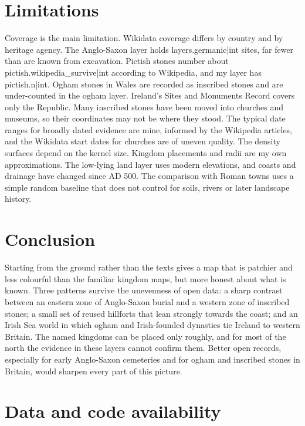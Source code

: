 \documentclass[11pt,a4paper]{article}
\begin{document}
\section{Limitations}

Coverage is the main limitation. Wikidata coverage differs by country and by heritage agency. The Anglo-Saxon layer holds {{layers.germanic|int}} sites, far fewer than are known from excavation. Pictish stones number about {{pictish.wikipedia_survive|int}} according to Wikipedia, and my layer has {{pictish.n|int}}. Ogham stones in Wales are recorded as inscribed stones and are under-counted in the ogham layer. Ireland's Sites and Monuments Record covers only the Republic. Many inscribed stones have been moved into churches and museums, so their coordinates may not be where they stood. The typical date ranges for broadly dated evidence are mine, informed by the Wikipedia articles, and the Wikidata start dates for churches are of uneven quality. The density surfaces depend on the kernel size. Kingdom placements and radii are my own approximations. The low-lying land layer uses modern elevations, and coasts and drainage have changed since AD 500. The comparison with Roman towns uses a simple random baseline that does not control for soils, rivers or later landscape history.

\section{Conclusion}

Starting from the ground rather than the texts gives a map that is patchier and less colourful than the familiar kingdom maps, but more honest about what is known. Three patterns survive the unevenness of open data: a sharp contrast between an eastern zone of Anglo-Saxon burial and a western zone of inscribed stones; a small set of reused hillforts that lean strongly towards the coast; and an Irish Sea world in which ogham and Irish-founded dynasties tie Ireland to western Britain. The named kingdoms can be placed only roughly, and for most of the north the evidence in these layers cannot confirm them. Better open records, especially for early Anglo-Saxon cemeteries and for ogham and inscribed stones in Britain, would sharpen every part of this picture.

\section*{Data and code availability}
\end{document}
